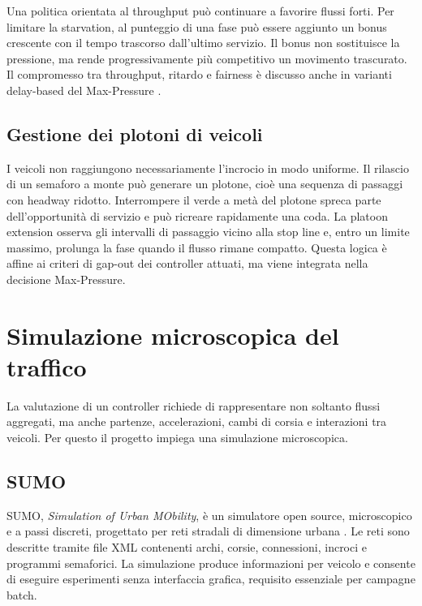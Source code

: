 \documentclass[12pt,a4paper,oneside]{report}
\numberwithin{equation}{chapter}
\begin{document}
Una politica orientata al throughput può continuare a favorire flussi forti.
Per limitare la starvation, al punteggio di una fase può essere aggiunto un
bonus crescente con il tempo trascorso dall'ultimo servizio. Il bonus non
sostituisce la pressione, ma rende progressivamente più competitivo un
movimento trascurato. Il compromesso tra throughput, ritardo e fairness è
discusso anche in varianti delay-based del Max-Pressure
\cite{wu2018fairness,liu2022delay}.

\subsection{Gestione dei plotoni di veicoli}

I veicoli non raggiungono necessariamente l'incrocio in modo uniforme. Il
rilascio di un semaforo a monte può generare un plotone, cioè una sequenza di
passaggi con headway ridotto. Interrompere il verde a metà del plotone spreca
parte dell'opportunità di servizio e può ricreare rapidamente una coda. La
platoon extension osserva gli intervalli di passaggio vicino alla stop line e,
entro un limite massimo, prolunga la fase quando il flusso rimane compatto.
Questa logica è affine ai criteri di gap-out dei controller attuati, ma viene
integrata nella decisione Max-Pressure.

\section{Simulazione microscopica del traffico}

La valutazione di un controller richiede di rappresentare non soltanto flussi
aggregati, ma anche partenze, accelerazioni, cambi di corsia e interazioni tra
veicoli. Per questo il progetto impiega una simulazione microscopica.

\subsection{SUMO}

SUMO, \emph{Simulation of Urban MObility}, è un simulatore open source,
microscopico e a passi discreti, progettato per reti stradali di dimensione
urbana \cite{behrisch2011sumo,sumodocs2026}. Le reti sono descritte tramite file
XML contenenti archi, corsie, connessioni, incroci e programmi semaforici. La
simulazione produce informazioni per veicolo e consente di eseguire esperimenti
senza interfaccia grafica, requisito essenziale per campagne batch.
\end{document}
